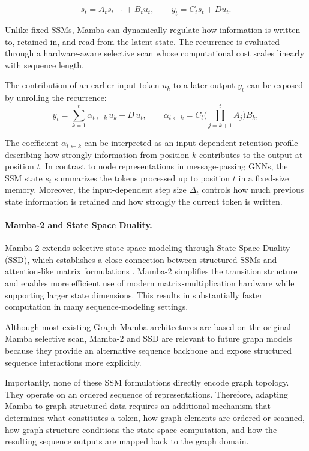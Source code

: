 \documentclass[acmsmall]{acmart}
\begin{document}
\begin{equation}
s_t
=
\bar{A}_t s_{t-1}
+
\bar{B}_t u_t,
\qquad
y_t
=
C_t s_t
+
D u_t .
\label{eq:mamba-recurrence}
\end{equation}

Unlike fixed SSMs, Mamba can dynamically regulate how information is written
to, retained in, and read from the latent state. The recurrence is evaluated
through a hardware-aware selective scan whose computational cost scales
linearly with sequence length.

The contribution of an earlier input token $u_k$ to a later output $y_t$ can
be exposed by unrolling the recurrence:
\begin{equation}
y_t=\sum_{k=1}^{t}\alpha_{t\leftarrow k}\,u_k+D\,u_t,\qquad
\alpha_{t\leftarrow k}=C_t\Big(\prod_{j=k+1}^{t}\bar A_j\Big)\bar B_k ,
\label{eq:alpha-retention}
\end{equation}

The coefficient $\alpha_{t\leftarrow k}$ can be interpreted as an
input-dependent retention profile describing how strongly information from
position $k$ contributes to the output at position $t$. 
In contrast to node representations in message-passing GNNs, the SSM state $s_t$
summarizes the tokens processed up to position $t$ in a fixed-size memory.
Moreover, the input-dependent step size $\Delta_t$ controls how much previous
state information is retained and how strongly the current token is written.


\paragraph{\textbf{Mamba-2 and State Space Duality.}}
Mamba-2 extends selective state-space modeling through State Space Duality
(SSD), which establishes a close connection between structured SSMs and
attention-like matrix formulations \cite{dao2024transformers}. Mamba-2
simplifies the transition structure and enables more efficient use of modern
matrix-multiplication hardware while supporting larger state dimensions. This
results in substantially faster computation in many sequence-modeling settings.

Although most existing Graph Mamba architectures are based on the original
Mamba selective scan, Mamba-2 and SSD are relevant to future graph models
because they provide an alternative sequence backbone and expose structured
sequence interactions more explicitly.

Importantly, none of these SSM formulations directly encode graph topology.
They operate on an ordered sequence of representations. Therefore, adapting
Mamba to graph-structured data requires an additional mechanism that determines
what constitutes a token, how graph elements are ordered or scanned, how graph
structure conditions the state-space computation, and how the resulting
sequence outputs are mapped back to the graph domain. 
\end{document}

